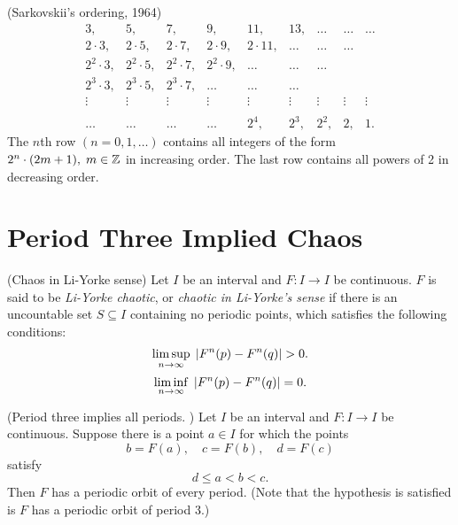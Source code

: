 \documentclass[11pt]{book}
\begin{document}
\begin{definition}
  (Sarkovskii's ordering, 1964)
  \[
    \begin{array}{ccccccccc}
    3, & 5, & 7, & 9, & 11, & 13, & \ldots & \ldots & \ldots\\
    2\cdot 3, & 2\cdot 5, & 2\cdot 7, & 2\cdot 9, & 2\cdot 11, & \ldots & \ldots & \ldots\\
    2^2\cdot 3, & 2^2\cdot 5, & 2^2\cdot 7, & 2^2\cdot 9, & \ldots & \ldots & \ldots\\
    2^3\cdot 3, & 2^3\cdot 5, & 2^3\cdot 7, & \ldots & \ldots & \ldots\\
    \vdots & \vdots & \vdots & \vdots & \vdots & \vdots & \vdots & \vdots  & \vdots \\
    \\
    \ldots & \ldots & \ldots & \ldots & 2^4, & 2^3, & 2^2, & 2, & 1.
  \end{array}
  \]
  The $n$th row $(n = 0, 1, \ldots)$ contains all integers of the form $2^n\cdot (2m + 1),\; m \in \mathbb{Z}$ in increasing order.
  The last row contains all powers of 2 in decreasing order.
  \label{defn:sarkovskiiordering}
\end{definition}

\section{Period Three Implied Chaos}
\begin{definition}
  (Chaos in Li-Yorke sense)
  Let $I$ be an interval and $F: I\to I$ be continuous. $F$ is said to be \textit{Li-Yorke chaotic}, or 
  \textit{chaotic in Li-Yorke's sense} if there is an uncountable set $S \subseteq I$ containing no
  periodic points, which satisfies the following conditions:
  \begin{equation*}
    \limsup\limits_{n \to \infty}\; \left | F^n(p) - F^n(q) \right | > 0.
  \end{equation*}
  \begin{equation*}
    \liminf\limits_{n \to \infty}\; \left | F^n(p) - F^n(q) \right | = 0.
  \end{equation*}

\end{definition}

\begin{proposition}
  (Period three implies all periods. \cite{li-yorke})
  Let $I$ be an interval and $F: I\to I$ be continuous. Suppose there is a point $a \in I$ for which
  the points
  \begin{equation*}
  b = F(a), \quad c = F(b), \quad d = F(c)
  \end{equation*}
  satisfy
  \begin{equation*}
    d \leq a < b < c.
  \end{equation*}
  Then $F$ has a periodic orbit of every period.
  (Note that the hypothesis is satisfied is $F$ has a periodic orbit of period 3.)
  \label{thm:liyorke1}
\end{proposition}
\end{document}
